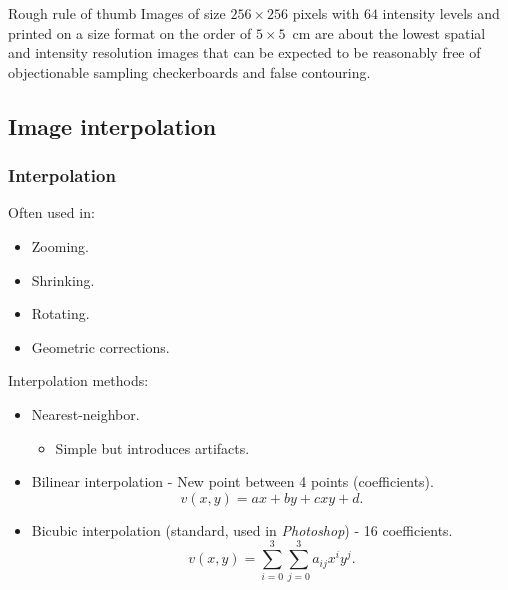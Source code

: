 
\begin{frame}
\begin{block}{Rough rule of thumb}
Images of size $256\times 256$ pixels with $64$ intensity levels and printed on a size format on the order of $5\times 5$~cm are about the lowest spatial and intensity resolution images that can be expected to be reasonably free of objectionable sampling checkerboards and false contouring.
\end{block}
\end{frame}


\subsection{Image interpolation}


\begin{frame}
\frametitle{Interpolation}
Often used in:
\begin{itemize}
\item Zooming.
\item Shrinking.
\item Rotating.
\item Geometric corrections.
\end{itemize}
\end{frame}


\begin{frame}
Interpolation methods:
\begin{itemize}
\item Nearest-neighbor.
\begin{itemize}
\item Simple but introduces artifacts.
\end{itemize}
\item Bilinear interpolation - New point between 4 points (coefficients).
\begin{equation}
v(x,y) = ax + by + cxy + d.
\end{equation}
\item Bicubic interpolation (standard, used in \textit{Photoshop}) - 16 coefficients.
\begin{equation}
v(x,y) = \sum_{i=0}^{3}\sum_{j=0}^{3}a_{ij}x^{i}y^{j}.
\end{equation}
\end{itemize}
\end{frame}

